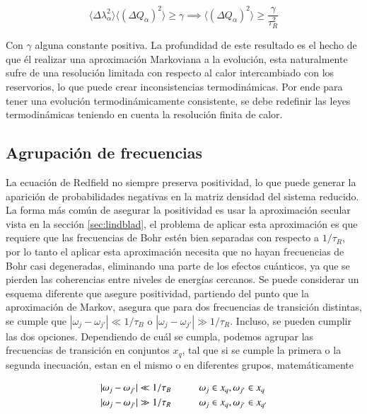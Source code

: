 \begin{equation*}
    \langle \Delta \lambda^{2}_{\alpha} \rangle \langle (\Delta Q_{\alpha})^{2}\rangle \geq \gamma \implies \langle (\Delta Q_{\alpha})^{2}\rangle  \geq \frac{\gamma}{\tau^{2}_{R}}
\end{equation*}

Con $\gamma$ alguna constante positiva. La profundidad de este resultado es el hecho de que él realizar una aproximación Markoviana a la evolución, esta naturalmente sufre de una resolución limitada con respecto al calor intercambiado con los reservorios, lo que puede crear inconsistencias termodinámicas. Por ende para tener una evolución termodinámicamente consistente, se debe redefinir las leyes termodinámicas teniendo en cuenta la resolución finita de calor.

\label{sec2:finiteresol}

\subsection{Agrupación de frecuencias}
La ecuación de Redfield no siempre preserva positividad, lo que puede generar la aparición de probabilidades negativas en la matriz densidad del sistema reducido. La forma más común de asegurar la positividad es usar la aproximación secular vista en la sección \ref{sec:lindblad}, el problema de aplicar esta aproximación es que requiere que las frecuencias de Bohr estén bien separadas con respecto a $1/\tau_{R}$, por lo tanto el aplicar esta aproximación necesita que no hayan frecuencias de Bohr casi degeneradas, eliminando una parte de los efectos cuánticos, ya que se pierden las coherencias entre niveles de energías cercanos\cite{trushechkin2021unified}. Se puede considerar un esquema diferente que asegure positividad, partiendo del punto que la aproximación de Markov, asegura que para dos frecuencias de transición distintas, se cumple que $|\omega_{j} - \omega_{j'}|\ll 1/\tau_{B}$ o $|\omega_{j}-\omega_{j'}|\gg 1/\tau_{R}$. Incluso, se pueden cumplir las dos opciones. Dependiendo de cuál se cumpla, podemos agrupar las frecuencias de transición en conjuntos $x_{q}$, tal que si se cumple la primera o la segunda inecuación, estan en el mismo o en diferentes grupos, matemáticamente

\begin{align*}
    |\omega_{j}-\omega_{j'}| \ll 1/\tau_{B}  &\hspace{10mm} \omega_{j} \in x_{q}, \omega_{j'} \in x_{q} \\
    |\omega_{j}-\omega_{j'}| \gg 1/\tau_{R}  &\hspace{10mm} \omega_{j} \in x_{q}, \omega_{j'} \in x_{q'}
\end{align*}

